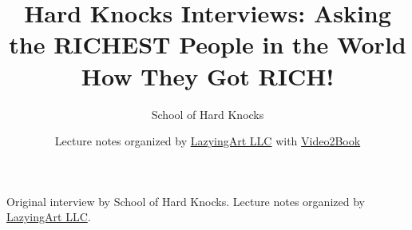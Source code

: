 \documentclass[11pt,oneside]{book}
\begin{document}
\frontmatter
\title{Hard Knocks Interviews: Asking the RICHEST People in the World How They Got RICH!}
\author{School of Hard Knocks}
\date{Lecture notes organized by \href{https://lazying.art}{LazyingArt LLC} with \href{https://github.com/lachlanchen/Video2Book}{Video2Book}}
\maketitle
\begin{center}
\small Original interview by School of Hard Knocks. Lecture notes organized by \href{https://lazying.art}{LazyingArt LLC}.
\end{center}
\clearpage
\mainmatter

\end{document}
